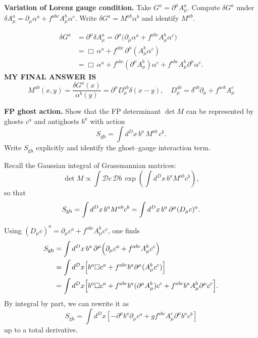 \begin{problem}
    \textbf{Variation of Lorenz gauge condition.} Take \(G^a=\partial^\mu A_\mu^a\). Compute \(\delta G^a\) under \(\delta A_\mu^a=\partial_\mu\alpha^a+f^{abc}A_\mu^b\alpha^c\). Write \(\delta G^a=M^{ab}\alpha^b\) and identify \(M^{ab}\).
\end{problem}
\begin{solution}[35.1]
\[	
	\begin{aligned}
		\delta G^a
		&= \partial^\mu \delta A_\mu^a
		= \partial^\mu\Big(\partial_\mu\alpha^a + f^{abc}A_\mu^b\alpha^c\Big) \\
		&= \Box\,\alpha^a + f^{abc}\,\partial^\mu(A_\mu^b\alpha^c) \\
		&= \Box\,\alpha^a + f^{abc}(\partial^\mu A_\mu^b)\alpha^c + f^{abc}A_\mu^b\partial^\mu\alpha^c .
	\end{aligned}\]
	\textbf{MY FINAL ANSWER IS}
	\[
	\boxed{
		M^{ab}(x,y) = \frac{\delta G^a(x)}{\alpha^b(y)}=\partial^\mu D_\mu^{ab}\delta(x-y), \quad
		D_\mu^{ab} = \delta^{ab}\partial_\mu + f^{acb}A_\mu^c }
	\]
\end{solution}
\begin{problem}
    \textbf{FP ghost action.} Show that the FP determinant \(\det M\) can be represented by ghosts \(c^a\) and antighosts \(b^a\) with action
    \[
        S_{\text{gh}}=\int d^Dx\, b^a\,M^{ab}\,c^b.
    \]
    Write \(S_{\text{gh}}\) explicitly and identify the ghost–gauge interaction term.
\end{problem}
\begin{solution}[35.2]
	Recall the Gaussian integral of Grassmannian matrices:
	\[
		\det M \propto \int \mathcal Dc\,\mathcal Db\,
		\exp\!\left(\int d^Dx\, b^a M^{ab} c^b\right),
	\]
	so that
	\[
		S_{\rm gh}=\int d^Dx\, b^a M^{ab} c^b
		= \int d^Dx\, b^a\,\partial^\mu(D_\mu c)^a .
	\]
	
	Using $(D_\mu c)^a=\partial_\mu c^a+f^{abc}A_\mu^b c^c$, one finds
\[	\begin{aligned}
		S_{\rm gh}
		&= \int d^Dx\, b^a\,\partial^\mu\Big(\partial_\mu c^a+f^{abc}A_\mu^b c^c\Big) \\
		&= \int d^Dx\Big[ b^a\Box c^a + f^{abc}b^a\partial^\mu(A_\mu^b c^c)\Big] \\
		&= \int d^Dx\Big[ b^a\Box c^a
		+ f^{abc}b^a(\partial^\mu A_\mu^b)c^c
		+ f^{abc}b^aA_\mu^b\partial^\mu c^c\Big].
	\end{aligned}\]
	By integral by part, we can rewrite it as
	\[
	\boxed{
	S_{\text{gh}}=\int d^Dx\left[-\partial^{\mu}b^{a}\partial_{\mu}c^{a}+gf^{abc}A_{\mu}^{c}\partial^{\mu}b^{a}c^{b}\right]
}
	\]
	up to a total derivative.
\end{solution}
